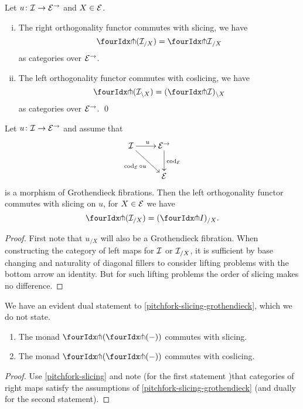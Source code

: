 \documentclass[reqno,10pt,a4paper,oneside,draft]{amsart}
\begin{document}
\begin{proposition} \label{pitchfork-slicing}
Let $u \co \cal{I} \to \catE^\to$ and $X \in \cal{E}$.
\begin{enumerate}[(i)]
\item The right orthogonality functor commutes with slicing, \ie we have
\[
  \liftr{(\cal{I}_{/X})} = {\liftr{\cal{I}}}_{/X}
\]
as categories over $\catE^\to$.
\item The left orthogonality functor commutes with coslicing, \ie we have
\[
  \liftl{(\cal{I}_{\backslash X})} = (\liftl{\cal{I}})_{\backslash X}
\]
as categories over $\catE^\to$.
\qed
\end{enumerate}
\end{proposition}

\begin{lemma} \label{pitchfork-slicing-grothendieck}
Let $u \co \cal{I} \to \cal{E}^\to$ and assume that
\[
\xymatrix{
  \cal{I}
  \ar[r]^{u}
  \ar[dr]_{\cod_{\cal{E}} \cc u}
&
  \cal{E}^\to
  \ar[d]^{\cod_{\cal{E}}}
\\&
  \cal{E}
}
\]
is a morphism of Grothendieck fibrations.
Then the left orthogonality functor commutes with slicing on $u$, \ie for $X \in \cal{E}$ we have
\[
  \liftl{(\cal{I}_{/X})} = (\liftl{I})_{/X}
.\]
\end{lemma}

\begin{proof}
First note that $u_{/X}$ will also be a Grothendieck fibration.
When constructing the category of left maps for $\cal{I}$ or $\cal{I}_{/X}$, it is sufficient by base changing and naturality of diagonal fillers to consider lifting problems with the bottom arrow an identity.
But for such lifting problems the order of slicing makes no difference.
\end{proof}

We have an evident dual statement to \cref{pitchfork-slicing-grothendieck}, which we do not state.

\begin{corollary} \label{pitchfork-slicing-monad}
\leavevmode
\begin{enumerate}[i]
\item The monad $\liftl{(\liftr{(-)})}$ commutes with slicing.
\item The monad $\liftr{(\liftl{(-)})}$ commutes with coslicing.
\end{enumerate}
\end{corollary}

\begin{proof}
Use \cref{pitchfork-slicing} and note (for the first statement )that categories of right maps satisfy the assumptions of \cref{pitchfork-slicing-grothendieck} (and dually for the second statement).
\end{proof}
\end{document}
